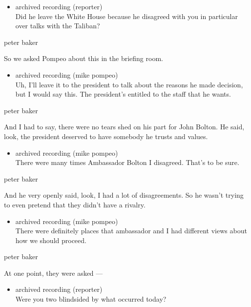 \begin{itemize}
\tightlist
\item
  archived recording (reporter)\\
  Did he leave the White House because he disagreed with you in
  particular over talks with the Taliban?
\end{itemize}

peter baker

So we asked Pompeo about this in the briefing room.

\begin{itemize}
\tightlist
\item
  archived recording (mike pompeo)\\
  Uh, I'll leave it to the president to talk about the reasons he made
  decision, but I would say this. The president's entitled to the staff
  that he wants.
\end{itemize}

peter baker

And I had to say, there were no tears shed on his part for John Bolton.
He said, look, the president deserved to have somebody he trusts and
values.

\begin{itemize}
\tightlist
\item
  archived recording (mike pompeo)\\
  There were many times Ambassador Bolton I disagreed. That's to be
  sure.
\end{itemize}

peter baker

And he very openly said, look, I had a lot of disagreements. So he
wasn't trying to even pretend that they didn't have a rivalry.

\begin{itemize}
\tightlist
\item
  archived recording (mike pompeo)\\
  There were definitely places that ambassador and I had different views
  about how we should proceed.
\end{itemize}

peter baker

At one point, they were asked ---

\begin{itemize}
\tightlist
\item
  archived recording (reporter)\\
  Were you two blindsided by what occurred today?
\end{itemize}

